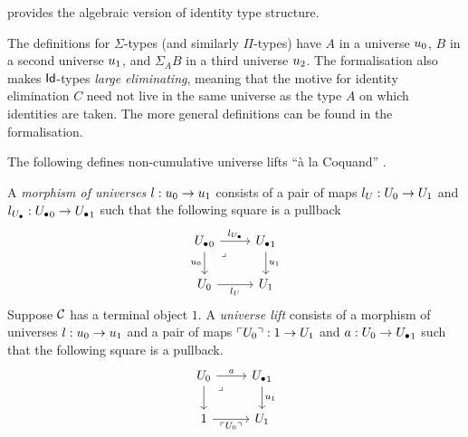  provides the algebraic version of identity type structure.

\begin{remark}\label{rmk:three-universes-generality}
The definitions for $\Sigma$-types (and similarly $\Pi$-types)
have $A$ in a universe ${u}_0$,
$B$ in a second universe ${u}_1$,
and $\Sigma_A B$ in a third universe ${u}_2$.
The formalisation also makes $\mathsf{Id}$-types \emph{large eliminating},
meaning that the motive for identity elimination $C$
need not live in the same universe as the type $A$ on which
identities are taken.
The more general definitions can be found in the formalisation.
\end{remark}

The following defines
non-cumulative universe lifts
``\`a la Coquand'' \cite{gratzer2020}.

\begin{definition}
  A \emph{morphism of universes} $l : {u}_0 \to {u}_1$ 
  consists of a pair of maps $l_U : U_0 \to U_1$
  and $l_{U_\bullet} : {U_\bullet}_0 \to {U_\bullet}_1$ such that 
  the following square is a pullback
  \[\begin{tikzcd}
	{\Ulow_0} & {\Ulow_1} \\
	{\U_0} & {\U_1}
	\arrow["{{{l_\Ulow}}}", from=1-1, to=1-2]
	\arrow["{{{\uu_0}}}"', from=1-1, to=2-1]
	\arrow["\lrcorner"{anchor=center, pos=0.125}, draw=none, from=1-1, to=2-2]
	\arrow["{\uu_1}", from=1-2, to=2-2]
	\arrow["{{{l_\U}}}"', from=2-1, to=2-2]
\end{tikzcd}\]
  Suppose $\mathcal{C}$ has a terminal object $1$.
  A \emph{universe lift} consists of
  a morphism of universes $l : {u}_0 \to {u}_1$
  and a pair of maps $\ulcorner U_0 \urcorner : 1 \to U_1$
  and $a : U_0 \to {U_\bullet}_1$
  such that the following square is a pullback.
\[\begin{tikzcd}
	{\U_0} & {\Ulow_1} \\
	1 & {\U_1}
	\arrow["{{a}}", from=1-1, to=1-2]
	\arrow[from=1-1, to=2-1]
	\arrow["\lrcorner"{anchor=center, pos=0.125}, draw=none, from=1-1, to=2-2]
	\arrow["{{{\uu_1}}}", from=1-2, to=2-2]
	\arrow["{{{\ulcorner U_0 \urcorner}}}"', from=2-1, to=2-2]
\end{tikzcd}\]
\end{definition}

